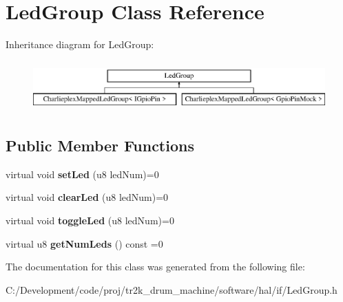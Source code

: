 \hypertarget{class_led_group}{}\section{Led\+Group Class Reference}
\label{class_led_group}
Inheritance diagram for Led\+Group\+:\begin{figure}[H]
\begin{center}
\leavevmode
\includegraphics[height=1.964912cm]{class_led_group}
\end{center}
\end{figure}
\subsection*{Public Member Functions}
\begin{DoxyCompactItemize}
\item 
\mbox{\label{class_led_group_aaec037c1898b9f898b1b148cda28a9a9}} 
virtual void {\bfseries set\+Led} (u8 led\+Num)=0
\item 
\mbox{\label{class_led_group_a103ae899182e0f0debd61c3ac7e6116e}} 
virtual void {\bfseries clear\+Led} (u8 led\+Num)=0
\item 
\mbox{\label{class_led_group_a07996e66a48089e97d7aa26ce7426f73}} 
virtual void {\bfseries toggle\+Led} (u8 led\+Num)=0
\item 
\mbox{\label{class_led_group_af9fc544e0b78fb7702ecda008a2fef62}} 
virtual u8 {\bfseries get\+Num\+Leds} () const =0
\end{DoxyCompactItemize}


The documentation for this class was generated from the following file\+:\begin{DoxyCompactItemize}
\item 
C\+:/\+Development/code/proj/tr2k\+\_\+drum\+\_\+machine/software/hal/if/Led\+Group.\+h\end{DoxyCompactItemize}
